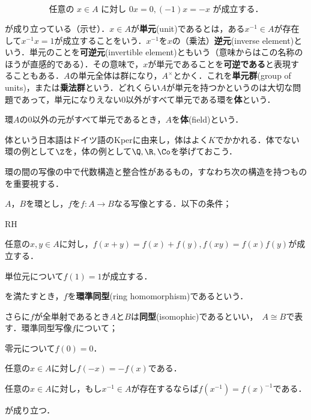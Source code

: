 \[\text{任意の }x\in A\text{ に対し }0x=0, (-1)x=-x\text{ が成立する．}\]

が成り立っている（示せ）．$x\in A$が\textbf{単元}(unit)であるとは，ある$x^{-1}\in A$が存在して$x^{-1}x=1$が成立することをいう．$x^{-1}$を$x$の（乗法）\textbf{逆元}(inverse element)という．単元のことを\textbf{可逆元}(invertible element)ともいう（意味からはこの名称のほうが直感的である）．その意味で，$x$が単元であることを\textbf{可逆である}と表現することもある．$A$の単元全体は群になり，$A^\times$とかく．これを\textbf{単元群}(group of units)，または\textbf{乗法群}という．どれくらい$A$が単元を持つかというのは大切な問題であって，単元になりえない$0$以外がすべて単元である環を\textbf{体}という．

\begin{defi}[体]
	環$A$の0以外の元がすべて単元であるとき，$A$を\textbf{体}(field)という．
\end{defi}

体という日本語はドイツ語のKperに由来し，体はよく$K$でかかれる．体でない環の例として$\Z$を，体の例として$\Q,\R,\Co$を挙げておこう．

環の間の写像の中で代数構造と整合性があるもの，すなわち次の構造を持つものを重要視する．

\begin{defi}[環準同型]
	$A，B$を環とし，$f$を$f:A\to B$なる写像とする．以下の条件；
	\begin{defiterm}{RH}
		\item 任意の$x,y\in A$に対し，$f(x+y)=f(x)+f(y), f(xy)=f(x)f(y)$が成立する．
		\item 単位元について$f(1)=1$が成立する．
	\end{defiterm}
	
	を満たすとき，$f$を\textbf{環準同型}(ring homomorphism)であるという．
\end{defi}

さらに$f$が全単射であるとき$A$と$B$は\textbf{同型}(isomophic)であるといい，~$A\cong B$で表す．環準同型写像$f$について；

\begin{sakura}
	\item 零元について$f(0)=0$．
	\item 任意の$x\in A$に対し$f(-x)=-f(x)$である．
	\item 任意の$x\in A$に対し，もし$x^{-1}\in A$が存在するならば$f(x^{-1})=f(x)^{-1}$である．
\end{sakura}
が成り立つ．

